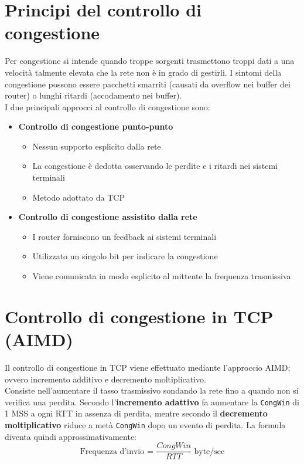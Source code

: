 \documentclass{report}
\begin{document}
	\section{Principi del controllo di congestione}
	Per congestione si intende quando troppe sorgenti trasmettono troppi dati a una velocità talmente elevata che la rete non è in grado di gestirli. I sintomi della congestione possono essere pacchetti smarriti (causati da overflow nei buffer dei router) o lunghi ritardi (accodamento nei buffer).
	\medskip\\I due principali approcci al controllo di congestione sono:
	\begin{itemize}
		\item \textbf{Controllo di congestione punto-punto}
		\begin{itemize}
			\item Nessun supporto esplicito dalla rete
			\item La congestione è dedotta osservando le perdite e i ritardi nei sistemi terminali
			\item Metodo adottato da TCP
		\end{itemize}
		\item \textbf{Controllo di congestione assistito dalla rete}
		\begin{itemize}
			\item I router forniscono un feedback ai sistemi terminali
			\item Utilizzato un singolo bit per indicare la congestione
			\item Viene comunicata in modo esplicito al mittente la frequenza trasmissiva
		\end{itemize}
	\end{itemize}
	\section{Controllo di congestione in TCP (AIMD)}
	Il controllo di congestione in TCP viene effettuato mediante l'approccio AIMD; ovvero incremento additivo e decremento moltiplicativo.
	\medskip\\Consiste nell'aumentare il tasso trasmissivo sondando la rete fino a quando non si verifica una perdita. Secondo l'\textbf{incremento adattivo} fa aumentare la \verb|CongWin| di 1 MSS a ogni RTT in assenza di perdita, mentre secondo il \textbf{decremento moltiplicativo} riduce a metà \verb|CongWin| dopo un evento di perdita. La formula diventa quindi approssimativamente:
	\begin{displaymath}
  		\text{Frequenza d'invio = }\frac{CongWin}{RTT}\text{ byte/sec}
	\end{displaymath}
	
\end{document}

